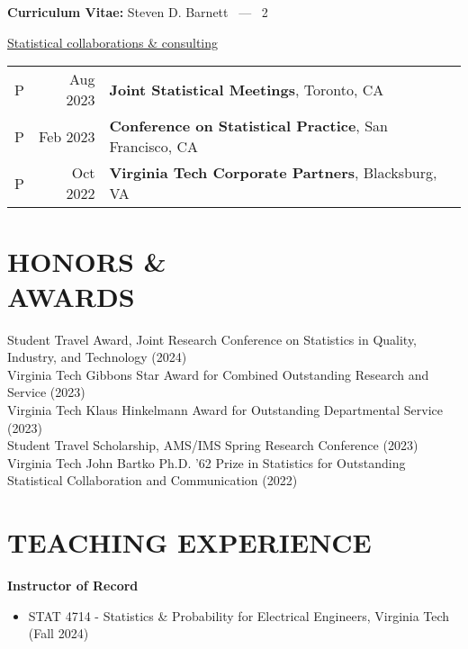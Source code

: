\documentclass[margin,line]{res}
\begin{document}
\begin{resume}
\pagebreak
\section{}
\hfill {\bf Curriculum Vitae:} Steven D. Barnett \  --- \  2

\underline{Statistical collaborations \& consulting}\\
\begin{tabular}{lrl}
P\quad\quad & Aug 2023 & {\bf Joint Statistical Meetings}, Toronto, CA \\
P\quad\quad & Feb 2023 & {\bf Conference on Statistical Practice}, San Francisco, CA \\
P\quad\quad & Oct 2022 & {\bf Virginia Tech Corporate Partners}, Blacksburg, VA \\
\end{tabular}

\section{\bf HONORS \& \\ AWARDS}
Student Travel Award, Joint Research Conference on Statistics in Quality, Industry, and Technology (2024) \\
Virginia Tech Gibbons Star Award for Combined Outstanding Research and Service (2023) \\
Virginia Tech Klaus Hinkelmann Award for Outstanding Departmental Service (2023) \\
Student Travel Scholarship, AMS/IMS Spring Research Conference (2023) \\
Virginia Tech John Bartko Ph.D. ’62 Prize in Statistics for Outstanding Statistical Collaboration and Communication (2022)

\section{TEACHING EXPERIENCE}

{\bf Instructor of Record}
\begin{itemize}
\itemsep -0.9pt
\item {\sc STAT 4714} - Statistics \& Probability for Electrical Engineers, {\sc Virginia Tech} (Fall 2024)
\end{itemize}


\end{resume}
\end{document}
